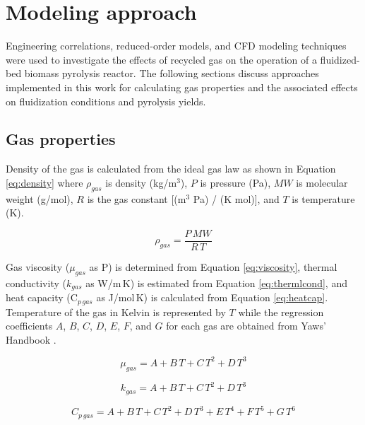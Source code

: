 
\section{Modeling approach}

Engineering correlations, reduced-order models, and CFD modeling techniques were used to investigate the effects of recycled gas on the operation of a fluidized-bed biomass pyrolysis reactor. The following sections discuss approaches implemented in this work for calculating gas properties and the associated effects on fluidization conditions and pyrolysis yields.

\subsection{Gas properties}

Density of the gas is calculated from the ideal gas law as shown in Equation \ref{eq:density} where $\rho_{gas}$ is density (kg/m$^3$), $P$ is pressure (Pa), $MW$ is molecular weight (g/mol), $R$ is the gas constant [(m$^3$ Pa) / (K mol)], and $T$ is temperature (K).

\begin{equation}\label{eq:density}
    \rho_{gas} = \frac{P\,MW}{R\,T}
\end{equation}

Gas viscosity ($\mu_{gas}$ as \textmugreek P) is determined from Equation \ref{eq:viscosity}, thermal conductivity ($k_{gas}$ as W/m\,K) is estimated from Equation \ref{eq:thermlcond}, and heat capacity (C$_{p\,gas}$ as J/mol\,K) is calculated from Equation \ref{eq:heatcap}. Temperature of the gas in Kelvin is represented by $T$ while the regression coefficients $A$, $B$, $C$, $D$, $E$, $F$, and $G$ for each gas are obtained from Yaws' Handbook \cite{Yaws2014}.

\begin{equation}\label{eq:viscosity}
    \mu_{gas} = A + B\,T + C\,T^2 + D\,T^3
\end{equation}

\begin{equation}\label{eq:thermlcond}
    k_{gas} = A + B\,T + C\,T^2 + D\,T^3
\end{equation}

\begin{equation}\label{eq:heatcap}
    C_{p\,gas} = A + B\,T + C\,T^2 + D\,T^3 + E\,T^4 + F\,T^5 + G\,T^6
\end{equation}

